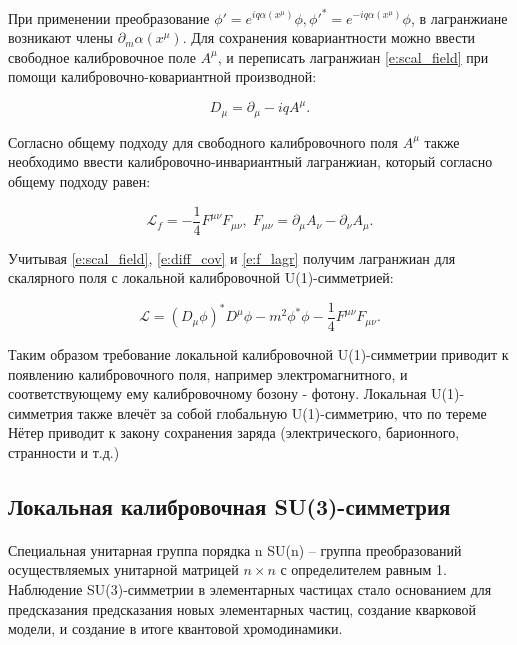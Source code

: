 \documentclass[a4paper,12pt]{article} %
\begin{document}
При применении преобразование $\phi' = e^{iq\alpha(x^\mu)} \phi, \phi'^* = e^{-iq\alpha(x^\mu)} \phi$, в лагранжиане возникают члены $\partial_m \alpha(x^\mu)$. Для сохранения ковариантности можно ввести свободное калибровочное поле $A^\mu$, и переписать лагранжиан \eqref{e:scal_field} при помощи калибровочно-ковариантной производной:

\begin{equation}
D_\mu = \partial_\mu - iqA^\mu.
\label{e:diff_cov}
\end{equation}

Согласно общему подходу для свободного калибровочного поля $A^\mu$ также необходимо ввести калибровочно-инвариантный лагранжиан, который согласно общему подходу равен:

\begin{equation}
\mathcal{L}_f = - \frac{1}{4} F^{\mu \nu}F_{\mu \nu}, \; F_{\mu \nu} = \partial_\mu A_\nu - \partial_\nu A_\mu.
\label{e:f_lagr}
\end{equation}

Учитывая \eqref{e:scal_field}, \eqref{e:diff_cov} и \eqref{e:f_lagr} получим лагранжиан для скалярного поля с локальной калибровочной U(1)-симметрией:

\begin{equation}
\mathcal{L} = (D_\mu \phi)^* D^\mu \phi - m^2 \phi^* \phi - \frac{1}{4} F^{\mu \nu}F_{\mu \nu}.
\label{e:cov_lagr}
\end{equation}

Таким образом требование локальной калибровочной U(1)-симметрии приводит к появлению калибровочного поля, например электромагнитного, и соответствующему ему калибровочному бозону - фотону. Локальная U(1)-симметрия также влечёт за собой глобальную U(1)-симметрию, что по тереме Нётер приводит к закону сохранения заряда (электрического, барионного, странности и т.д.)

\subsection{Локальная калибровочная SU(3)-симметрия} \label{ss:su3}

\paragraph{} Специальная унитарная группа порядка n SU(n) -- группа преобразований осуществляемых унитарной матрицей $n\times n$ с определителем равным 1. Наблюдение SU(3)-симметрии в элементарных частицах стало основанием для предсказания предсказания новых элементарных частиц, создание кварковой модели, и создание в итоге квантовой хромодинамики. 
\end{document}
